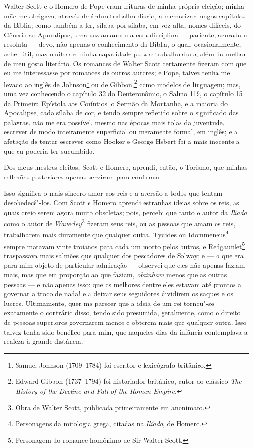 Walter Scott e o Homero de Pope eram leituras de minha própria eleição;
minha mãe me obrigava, através de árduo trabalho diário, a memorizar
longos capítulos da Bíblia; como também a ler, sílaba por sílaba, em voz
alta, nomes difíceis, do Gênesis ao Apocalipse, uma vez ao ano: e a essa
disciplina --- paciente, acurada e resoluta --- devo, não apenas o
conhecimento da Bíblia, o qual, ocasionalmente, achei útil, mas muito de
minha capacidade para o trabalho duro, além do melhor de meu gosto
literário. Os romances de Walter Scott certamente fizeram com que eu me
interessasse por romances de outros autores; e Pope, talvez tenha me
levado ao inglês de Johnson\footnote{Samuel Johnson (1709--1784) foi escritor e lexicógrafo britânico.} ou de Gibbon,\footnote{Edward Gibbon (1737--1794) foi historiador britânico, autor do clássico \textit{The History of the Decline and Fall of the Roman Empire}.} como modelos de linguagem; mas, uma vez conhecendo o capítulo 32 do Deuteronômio, o Salmo 119, o capítulo 15 da Primeira Epístola aos Coríntios, o Sermão da Montanha, e a maioria do
Apocalipse, cada sílaba de cor, e tendo sempre refletido sobre o
significado das palavras, não me era possível, mesmo nas épocas mais
tolas da juventude, escrever de modo inteiramente superficial ou
meramente formal, em inglês; e a afetação de tentar escrever como Hooker
e George Hebert foi a mais inocente a que eu poderia ter sucumbido.

Dos meus mestres eleitos, Scott e Homero, aprendi, então, o Torismo,
que minhas reflexões posteriores apenas serviram para confirmar.

Isso significa o mais sincero amor aos reis e a aversão a todos que
tentam desobedecê"-los. Com Scott e Homero aprendi estranhas ideias sobre
os reis, as quais creio serem agora muito obsoletas; pois, percebi que
tanto o autor da \textit{Ilíada} como o autor de \textit{Waverley}\footnote{Obra
de Walter Scott, publicada primeiramente em anonimato.}
fizeram seus reis, ou as pessoas que amam os reis, trabalharem mais
duramente que qualquer outra. Tydides ou Idommeneus\footnote{Personagens
  da mitologia grega, citadas na \textit{Ilíada}, de Homero.} sempre matavam vinte troianos para cada um morto pelos outros,
e Redgaunlet\footnote{Personagem do romance homônimo de Sir Walter Scott.} traspassava mais salmões que qualquer dos pescadores
de Solway; e --- o que era para mim objeto de particular admiração ---
observei que eles não apenas faziam mais, mas que em proporção ao que
faziam, \textit{obtinham} menos que as outras pessoas --- e não apenas
isso: que os melhores dentre eles estavam até prontos a governar a troco
de nada! e a deixar seus seguidores dividirem os saques e os lucros.
Ultimamente, quer me parecer que a ideia de um rei tornou"-se exatamente
o contrário disso, tendo sido presumida, geralmente, como o direito de
pessoas superiores governarem menos e obterem mais que qualquer outra. 
Isso talvez tenha sido benéfico para mim, que naqueles dias da
infância contemplava a realeza à grande distância.

